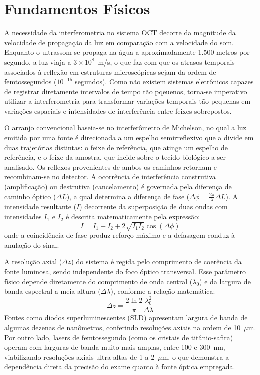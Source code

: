 \documentclass[a4paper,12pt,oneside,openright]{abntex2}
\begin{document}
\section{Fundamentos Físicos}

A necessidade da interferometria no sistema OCT decorre da magnitude da velocidade de propagação da luz em comparação com a velocidade do som. Enquanto o ultrassom se propaga na água a aproximadamente 1.500 metros por segundo, a luz viaja a $3 \times 10^8$~m/s, o que faz com que os atrasos temporais associados à reflexão em estruturas microscópicas sejam da ordem de femtossegundos ($10^{-15}$ segundos). Como não existem sistemas eletrônicos capazes de registrar diretamente intervalos de tempo tão pqeuenos, torna-se imperativo utilizar a interferometria para transformar variações temporais tão pequenas em variações espaciais e intensidades de interferência entre feixes sobrepostos.

O arranjo convencional baseia-se no interferômetro de Michelson, no qual a luz emitida por uma fonte é direcionada a um espelho semirreflexivo que a divide em duas trajetórias distintas: o feixe de referência, que atinge um espelho de referência, e o feixe da amostra, que incide sobre o tecido biológico a ser analisado. Os reflexos provenientes de ambos os caminhos retornam e recombinam-se no detector. A ocorrência de interferência construtiva (amplificação) ou destrutiva (cancelamento) é governada pela diferença de caminho óptico ($\Delta L$), a qual determina a diferença de fase ($\Delta \phi = \frac{2\pi}{\lambda}\Delta L$). A intensidade resultante ($I$) decorrente da superposição de duas ondas com intensidades $I_1$ e $I_2$ é descrita matematicamente pela expressão:
\begin{equation}
I = I_1 + I_2 + 2\sqrt{I_1 I_2}\cos(\Delta \phi)
\end{equation}
onde a coincidência de fase produz reforço máximo e a defasagem conduz à anulação do sinal.

A resolução axial ($\Delta z$) do sistema é regida pelo comprimento de coerência da fonte luminosa, sendo independente do foco óptico transversal. Esse parâmetro físico depende diretamente do comprimento de onda central ($\lambda_0$) e da largura de banda espectral a meia altura ($\Delta \lambda$), conforme a relação matemática:
\begin{equation}
\Delta z = \frac{2\ln 2}{\pi} \frac{\lambda_0^2}{\Delta \lambda}
\end{equation}
Fontes como diodos superluminescentes (SLD) apresentam largura de banda de algumas dezenas de nanômetros, conferindo resoluções axiais na ordem de 10~$\mu$m. Por outro lado, lasers de femtossegundo (como os cristais de titânio-safira) operam com larguras de banda muito mais amplas, entre 100 e 300~nm, viabilizando resoluções axiais ultra-altas de 1 a 2~$\mu$m, o que demonstra a dependência direta da precisão do exame quanto à fonte óptica empregada.
\end{document}
